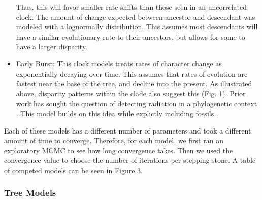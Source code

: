 \documentclass{article}
\begin{document}
\begin{itemize}
    Thus, this will favor smaller rate shifts than those seen in an uncorrelated clock. 
    The amount of change expected between ancestor and descendant was modeled with a lognormally distribution.
    This assumes most descendants will have a similar evolutionary rate to their ancestors, but allows for some to have a larger disparity.
    \item Early Burst: This clock models treats rates of character change as exponentially decaying over time. 
    This assumes that rates of evolution are fastest near the base of the tree, and decline into the present. 
    As illustrated above, disparity patterns within the clade also suggest this (Fig. 1).
    Prior work has sought the question of detecting radiation in a phylogenetic context \citep{Liow2010}.
    This model builds on this idea while explictly including fossils \citep{Quental2009, Quental2010}. %
\end{itemize}

Each of these models has a different number of parameters and took a different amount of time to converge. Therefore, for each model, we first ran an exploratory MCMC to see how long convergence takes. Then we used the convergence value to choose the number of iterations per stepping stone.
A table of competed models can be seen in Figure 3.

\subsubsection{Tree Models}
\end{document}
